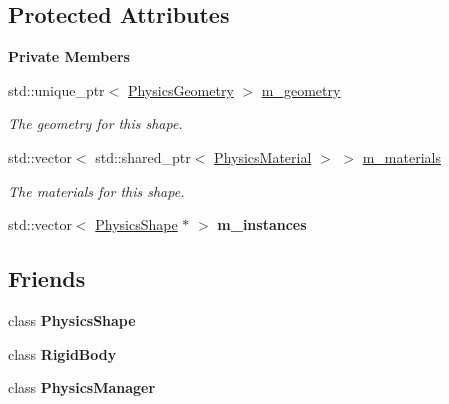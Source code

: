 \subsection*{Protected Attributes}
\begin{Indent}\textbf{ Private Members}\par
\begin{DoxyCompactItemize}
\item 
\mbox{\label{classrev_1_1_physics_shape_prefab_adda5b759248b960c2d78f1bbee776482}} 
std\+::unique\+\_\+ptr$<$ \mbox{\hyperlink{classrev_1_1_physics_geometry}{Physics\+Geometry}} $>$ \mbox{\hyperlink{classrev_1_1_physics_shape_prefab_adda5b759248b960c2d78f1bbee776482}{m\+\_\+geometry}}
\begin{DoxyCompactList}\small\item\em The geometry for this shape. \end{DoxyCompactList}\item 
\mbox{\label{classrev_1_1_physics_shape_prefab_a0e7f2bc6dbbb90b01111ae36bbf1327c}} 
std\+::vector$<$ std\+::shared\+\_\+ptr$<$ \mbox{\hyperlink{classrev_1_1_physics_material}{Physics\+Material}} $>$ $>$ \mbox{\hyperlink{classrev_1_1_physics_shape_prefab_a0e7f2bc6dbbb90b01111ae36bbf1327c}{m\+\_\+materials}}
\begin{DoxyCompactList}\small\item\em The materials for this shape. \end{DoxyCompactList}\item 
\mbox{\label{classrev_1_1_physics_shape_prefab_af2681d74146998a3872e94a41f5da651}} 
std\+::vector$<$ \mbox{\hyperlink{classrev_1_1_physics_shape}{Physics\+Shape}} $\ast$ $>$ {\bfseries m\+\_\+instances}
\end{DoxyCompactItemize}
\end{Indent}
\subsection*{Friends}
\begin{DoxyCompactItemize}
\item 
\mbox{\label{classrev_1_1_physics_shape_prefab_a726223aef7972f289c4a01ccfd23d5ee}} 
class {\bfseries Physics\+Shape}
\item 
\mbox{\label{classrev_1_1_physics_shape_prefab_abb8b03bec6b0a8e0834c8358c93039d2}} 
class {\bfseries Rigid\+Body}
\item 
\mbox{\label{classrev_1_1_physics_shape_prefab_a139cf05ac01161b7071c8a037c841683}} 
class {\bfseries Physics\+Manager}
\end{DoxyCompactItemize}
